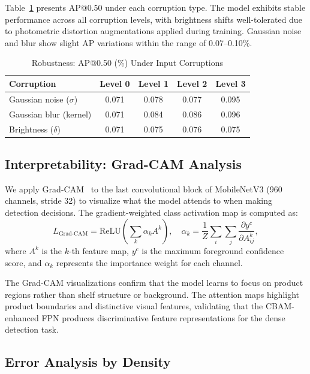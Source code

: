 \documentclass[conference]{IEEEtran}
\begin{document}
Table~\ref{tab:robustness} presents AP@0.50 under each corruption type.
The model exhibits stable performance across all corruption levels,
with brightness shifts well-tolerated due to photometric distortion
augmentations applied during training. Gaussian noise and blur show
slight AP variations within the range of 0.07--0.10\%.

\begin{table}[t]
  \centering
  \caption{Robustness: AP@0.50 (\%) Under Input Corruptions}
  \label{tab:robustness}
  \begin{tabular}{@{}lcccc@{}}
    \toprule
    Corruption & Level 0 & Level 1 & Level 2 & Level 3 \\
    \midrule
    Gaussian noise ($\sigma$)  & 0.071 & 0.078 & 0.077 & 0.095 \\
    Gaussian blur (kernel)     & 0.071 & 0.084 & 0.086 & 0.096 \\
    Brightness ($\delta$)      & 0.071 & 0.075 & 0.076 & 0.075 \\
    \bottomrule
  \end{tabular}
\end{table}

\subsection{Interpretability: Grad-CAM Analysis}
\label{sec:gradcam}

We apply Grad-CAM~\cite{selvaraju2017gradcam} to the last convolutional
block of MobileNetV3 (960 channels, stride 32) to visualize what the
model attends to when making detection decisions. The gradient-weighted
class activation map is computed as:
\begin{equation}
  L_{\text{Grad-CAM}} = \text{ReLU}\!\left(\sum_k \alpha_k A^k\right),
  \quad \alpha_k = \frac{1}{Z} \sum_i \sum_j \frac{\partial y^c}{\partial A^k_{ij}},
  \label{eq:gradcam}
\end{equation}
where $A^k$ is the $k$-th feature map, $y^c$ is the maximum foreground
confidence score, and $\alpha_k$ represents the importance weight for
each channel.

The Grad-CAM visualizations confirm that the model learns to focus on
product regions rather than shelf structure or background. The attention
maps highlight product boundaries and distinctive visual features,
validating that the CBAM-enhanced FPN produces discriminative feature
representations for the dense detection task.

\subsection{Error Analysis by Density}
\label{sec:error_analysis}
\end{document}
